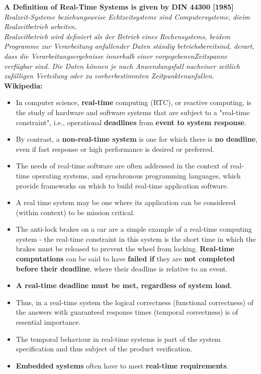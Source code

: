 {\rot\bf A Definition of Real-Time Systems is given by DIN 44300 [1985]}\\

\textit{ Realzeit-Systeme beziehungsweise Echtzeitsysteme sind Computersysteme, dieim Realzeitbetrieb arbeiten.}\\

\textit{Realzeitbetrieb wird definiert als der Betrieb eines Rechensystems, beidem Programme zur Verarbeitung anfallender Daten st\"{a}ndig betriebsbereitsind, derart, dass die Verarbeitungsergebnisse innerhalb einer vorgegebenenZeitspanne verf\"{u}gbar sind. Die Daten k\"{o}nnen je nach Anwendungsfall nacheiner zeitlich zuf\"{a}lligen Verteilung oder zu vorherbestimmten Zeitpunktenanfallen.}\\

{\rot\bf Wikipedia:}

\begin{itemize}
\item In computer science, \textbf{real-time} computing (RTC), or reactive computing, is the study of hardware and software systems that are subject to a "real-time constraint", i.e., operational \textbf{deadlines} from \textbf{event to system response}.
\item By contrast, a \textbf{non-real-time system}  is one for which there is \textbf{no deadline}, even if fast response or high performance is desired or preferred.
\item The needs of real-time software are often addressed in the context of real-time operating systems, and synchronous programming languages, which provide frameworks on which to build real-time application software.
\item A real time system may be one where its application can be considered (within context) to be mission critical.
\item The anti-lock brakes on a car are a simple example of a real-time computing system - the real-time constraint in this system is the short time in which the brakes must be released to prevent the wheel from locking. \textbf{Real-time computations} can be said to have \textbf{failed if} they are \textbf{not completed before their deadline}, where their deadline is relative to an event.
\item \textbf{A real-time deadline must be met, regardless of system load}.
\item Thus, in a real-time system the logical correctness (functional correctness) of the answers with guaranteed response times (temporal correctness) is of essential importance.
\item  The temporal behaviour in real-time systems is part of the system specification and thus subject of the product verification.
\item \textbf{Embedded systems} often have to meet \textbf{real-time requirements}.
\end{itemize}

